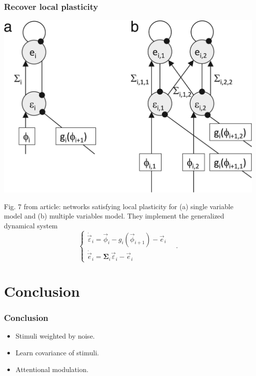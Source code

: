 \documentclass[aspectratio=169]{beamer}
\begin{document}
\begin{frame}
  \frametitle{Recover local plasticity}
  \begin{center}
    \includegraphics[width=0.4\textheight]{Fig7}
  \end{center}
  Fig. 7 from article: networks satisfying local plasticity for (a) single variable model and (b) multiple variables model. They implement the generalized dynamical system
  \begin{equation}
    \label{eq:dynamical_system_prediction_errors}
    \begin{cases}
      \dot{\vec{\varepsilon}}_i = \vec{\phi}_i - g_i(\vec{\phi}_{i+1}) - \vec{e}_i \\
      \dot{\vec{e}}_i = \boldsymbol{\Sigma}_i \vec{\varepsilon}_i - \vec{e}_i
    \end{cases}
    \quad .
  \end{equation}
\end{frame}



\section{Conclusion}
\begin{frame}
  \frametitle{Conclusion}
  \begin{itemize}
    \item Stimuli weighted by noise.
    \item Learn covariance of stimuli.
    \item Attentional modulation.
  \end{itemize}
\end{frame}
\end{document}
